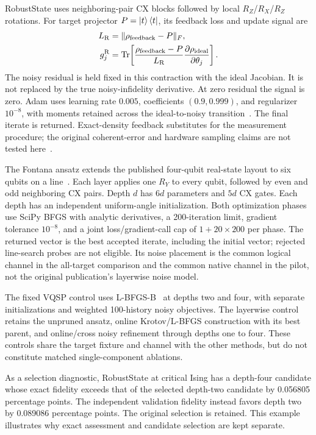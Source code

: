 RobustState uses neighboring-pair CX blocks followed by local
$R_Z$/$R_X$/$R_Z$ rotations. For target projector $P=\ket{t}\bra{t}$,
its feedback loss and update signal are
\begin{align}
 L_{\rm R}&=\|\rho_{\rm feedback}-P\|_F,\\
 g_j^{\rm R}&=\operatorname{Tr}\!\left[
 \frac{\rho_{\rm feedback}-P}{L_{\rm R}}
 \frac{\partial\rho_{\rm ideal}}{\partial\theta_j}\right].
 \label{eq:robuststate_feedback}
\end{align}
The noisy residual is held fixed in this contraction with the ideal
Jacobian. It is not replaced by the true noisy-infidelity derivative.
At zero residual the signal is zero. Adam uses learning rate $0.005$,
coefficients $(0.9,0.999)$, and regularizer $10^{-8}$, with moments
retained across the ideal-to-noisy transition~\cite{Kingma2015}.
The final iterate is returned. Exact-density feedback substitutes for
the measurement procedure; the original coherent-error and hardware
sampling claims are not tested here~\cite{RobustState2024}.

The Fontana ansatz extends the published four-qubit real-state layout
to six qubits on a line~\cite{Fontana2021}. Each layer applies one
$R_Y$ to every qubit, followed by even and odd neighboring CX pairs.
Depth $d$ has $6d$ parameters and $5d$ CX gates. Each depth has an
independent uniform-angle initialization. Both optimization phases
use SciPy BFGS with analytic derivatives, a 200-iteration limit,
gradient tolerance $10^{-8}$, and a joint loss/gradient-call cap of
$1+20\times200$ per phase. The returned vector is the best accepted
iterate, including the initial vector; rejected line-search probes are
not eligible. Its noise placement is the common logical channel in
the all-target comparison and the common native channel in the pilot,
not the original publication's layerwise noise model.

The fixed VQSP control uses L-BFGS-B~\cite{Byrd1995} at depths two and
four, with separate initializations and weighted 100-history noisy
objectives. The layerwise control retains the unpruned ansatz, online
Krotov/L-BFGS construction with its best parent, and online/cross noisy
refinement through depths one to four. These
controls share the target fixture and channel with the other methods,
but do not constitute matched single-component ablations.

As a selection diagnostic, RobustState at critical Ising has a depth-four
candidate whose exact fidelity exceeds that of the selected depth-two
candidate by 0.056805 percentage points. The independent validation
fidelity instead favors depth two by 0.089086 percentage points.
The original selection is retained. This example illustrates why
exact assessment and candidate selection are kept separate.


